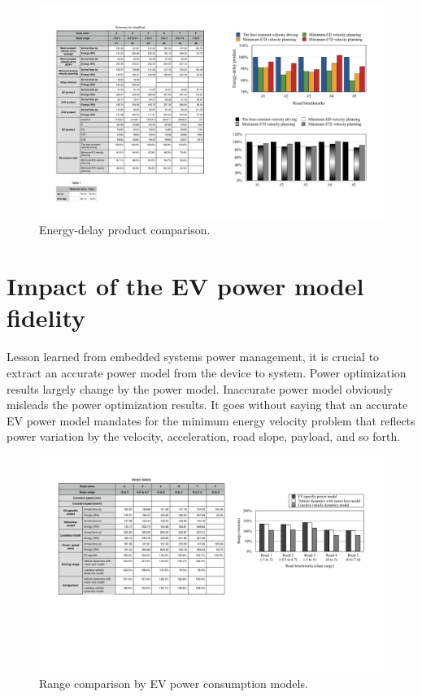 \documentclass{IEEEtran}
\begin{document}
\begin{figure}	 %
\centering
\includegraphics[width=\hsize]{Figures/EDP_bar.pdf}
\caption{Energy-delay product comparison.}
\label{fig:EDP_bar}
\end{figure} 


\section{Impact of the EV power model fidelity} \label{sec:impact_EV_power model}

Lesson learned from embedded systems power management, it is crucial to extract an accurate power model from the device to system. Power optimization results largely change by the power model. Inaccurate power model obviously misleads the power optimization results. It goes without saying that an accurate EV power model mandates for the minimum energy velocity problem that reflects power variation by the velocity, acceleration, road slope, payload, and so forth.

\begin{figure}	 %
\centering
\includegraphics[width=\hsize]{Figures/model_fidelity.pdf}
\caption{Range comparison by EV power consumption models.}
\label{fig:energy_by_model}
\end{figure} 
\end{document}

